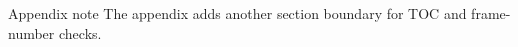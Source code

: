 \begin{frame}{Appendix note}
  The appendix adds another section boundary for TOC and frame-number checks.
\end{frame}
